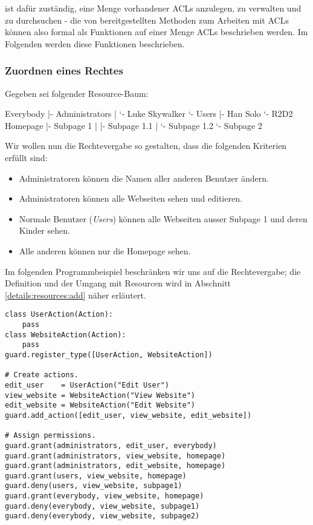 \product ist dafür zuständig, eine Menge vorhandener ACLs anzulegen, zu 
verwalten und zu durchsuchen - die von \product bereitgestellten Methoden 
zum Arbeiten mit ACLs können also formal als Funktionen auf einer Menge 
ACLs beschrieben werden. Im Folgenden werden diese Funktionen beschrieben.


\subsubsection{Zuordnen eines Rechtes}

Gegeben sei folgender Resource-Baum:

\begin{indentverb}
Everybody
  |- Administrators
  |   `- Luke Skywalker
  `- Users
      |- Han Solo
      `- R2D2
Homepage
  |- Subpage 1
  |   |- Subpage 1.1
  |   `- Subpage 1.2
  `- Subpage 2
\end{indentverb}

Wir wollen nun die Rechtevergabe so gestalten, dass die folgenden Kriterien 
erfüllt sind:

\begin{itemize}
\item Administratoren können die Namen aller anderen Benutzer ändern.
\item Administratoren können alle Webseiten sehen und editieren.
\item Normale Benutzer ({\it Users}) können alle Webseiten ausser Subpage 1
und deren Kinder sehen.
\item Alle anderen können nur die Homepage sehen.
\end{itemize}

Im folgenden Programmbeispiel beschränken wir uns auf die Rechtevergabe;
die Definition und der Umgang mit Resourcen wird in Abschnitt 
\ref{details:resources:add} näher erläutert.

\begin{lstlisting}
class UserAction(Action):
    pass
class WebsiteAction(Action):
    pass
guard.register_type([UserAction, WebsiteAction])

# Create actions.
edit_user    = UserAction("Edit User")
view_website = WebsiteAction("View Website")
edit_website = WebsiteAction("Edit Website")
guard.add_action([edit_user, view_website, edit_website])

# Assign permissions.
guard.grant(administrators, edit_user, everybody)
guard.grant(administrators, view_website, homepage)
guard.grant(administrators, edit_website, homepage)
guard.grant(users, view_website, homepage)
guard.deny(users, view_website, subpage1)
guard.grant(everybody, view_website, homepage)
guard.deny(everybody, view_website, subpage1)
guard.deny(everybody, view_website, subpage2)
\end{lstlisting}

